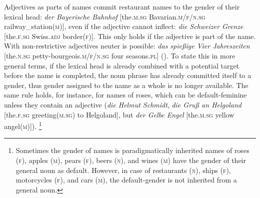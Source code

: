 \documentclass[output=collectionpaper]{langsci/langscibook}
\begin{document}
%

%

Adjectives as parts of names commit restaurant names to the gender of their lexical head: \textit{der Bayerische Bahnhof} [the.\textsc{m.sg} Bavarian.\textsc{m/f/n.sg} railway\_station(\textsc{m})], even if the adjective cannot inflect: \textit{die Schweizer Grenze} [the.\textsc{f.sg} Swiss.\textsc{adj} border(\textsc{f})]. This only holds if the adjective is part of the name. With non-restrictive adjectives neuter is possible: \textit{das spießige Vier Jahreszeiten} [the.\textsc{n.sg} petty-bourgeois.\textsc{m/f/n.sg} four seasons.\textsc{pl}] (\citealt{Plank2015}). To state this in more general terms, if the lexical head is already combined with a potential target before the name is completed, the noun phrase has already committed itself to a gender, thus gender assigned to the name as a whole is no longer available. The same rule holds, for instance, for names of roses, which can be default-feminine unless they contain an adjective (\textit{die Helmut Schmidt}, \textit{die Gruß an Helgoland} [the.\textsc{f.sg} greeting(\textsc{m.sg}) to Helgoland], but \textit{der Gelbe Engel} [the.\textsc{m.sg} yellow angel(\textsc{m})]).%
\footnote{%
Sometimes the gender of names is paradigmatically inherited \textendash{} names of roses (\textsc{f}), apples (\textsc{m}), pears (\textsc{f}), beers (\textsc{n}), and wines (\textsc{m}) have the gender of their general noun as default. However, in case of restaurants (\textsc{n}), ships (\textsc{f}), motorcycles (\textsc{f}), and cars (\textsc{m}), the default-gender is not inherited from a general noun.
} %
\end{document}
